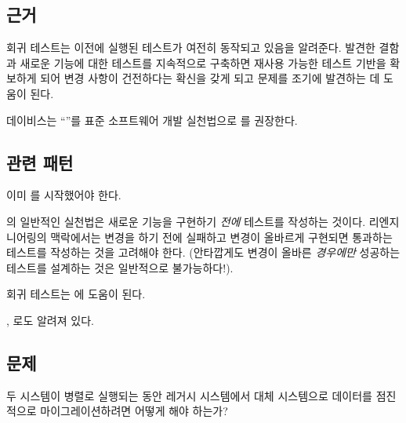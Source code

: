 \documentclass[a4paper,10pt,twoside]{book}
\begin{document}
\subsection*{근거}

회귀 테스트는 이전에 실행된 테스트가 여전히 동작되고 있음을 알려준다. 발견한 결함과 새로운 기능에 대한 테스트를 지속적으로 구축하면 재사용 가능한 테스트 기반을 확보하게 되어 변경 사항이 건전하다는 확신을 갖게 되고 문제를 조기에 발견하는 데 도움이 된다.

데이비스는  ``''를 표준 소프트웨어 개발 실천법으로 \cite{Davi95a}를 권장한다.

\subsection*{관련 패턴}

이미 를 시작했어야 한다. 

 의 일반적인 실천법은 새로운 기능을 구현하기 \cite{Jeff01a} \emph{전에} 테스트를 작성하는 것이다. 리엔지니어링의 맥락에서는 변경을 하기 전에 실패하고 변경이 올바르게 구현되면 통과하는 테스트를 작성하는 것을 고려해야 한다. (안타깝게도 변경이 올바른 \emph{경우에만} 성공하는 테스트를 설계하는 것은 일반적으로 불가능하다!).

회귀 테스트는 에 도움이 된다.


 \cite{Kell00a},  \cite{Brod95a}로도 알려져 있다.


\subsection*{문제}

두 시스템이 병렬로 실행되는 동안 레거시 시스템에서 대체 시스템으로 데이터를 점진적으로 마이그레이션하려면 어떻게 해야 하는가?
\end{document}
